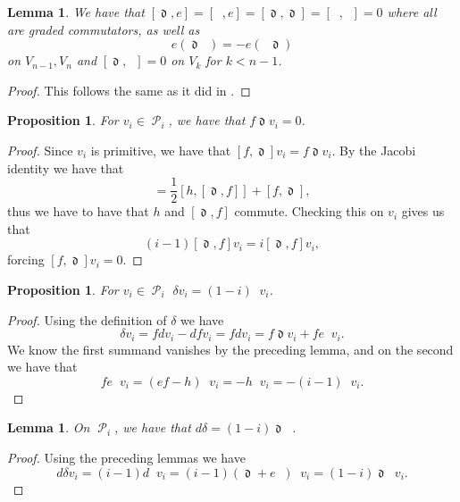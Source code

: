 \documentclass{amsart}
\newtheorem{lemma}[theorem]{Lemma}
\newtheorem{prop}[theorem]{Proposition}
\DeclareMathOperator{\dee}{\mathfrak{d}}
\DeclareMathOperator{\deebar}{\overline{\mathfrak{d}}}
\DeclareMathOperator{\Prim}{\mathcal{P}}
\theoremstyle{definition}
\begin{document}
\begin{lemma}
    We have that $[\dee,e]=[\deebar,e]=[\dee,\dee]=[\deebar,\deebar]=0$ where all are graded commutators, as well as
    \begin{equation*}
        e(\dee \deebar) = - e (\deebar \dee)
    \end{equation*}
      on $V_{n-1},V_n$ and $[\dee,\deebar]=0$ on $V_k$ for $k < n-1$.
\end{lemma}
\begin{proof}
    This follows the same as it did in \cite[Lemma 2.5]{tseng2012cohomologyhodgetheorysymplectic}.
\end{proof}
\begin{prop}
    For $v_i \in \Prim_i$, we have that $f \dee v_i=0$.
\end{prop}
\begin{proof}
    Since $v_i$ is primitive, we have that $[f,\dee]v_i = f \dee v_i$. By the Jacobi identity we have that 
    \begin{equation*}
        [f,\dee] = \frac{1}{2}[h,[\dee ,f]] + [f, \dee],
    \end{equation*}
    thus we have to have that $h$ and $[\dee,f]$ commute. Checking this on $v_i$ gives us that
    \begin{equation*}
        (i-1)[\dee,f]v_i = i[\dee,f]v_i,
    \end{equation*}
    forcing $[f,\dee]v_i=0$.
\end{proof}
\begin{prop}
 For $v_i \in \Prim_i$ $\delta v_i = (1-i)\deebar v_i$.
\end{prop}
\begin{proof}
    Using the definition of $\delta$ we have
    \begin{equation*}
        \delta v_i = fdv_i - dfv_i = fdv_i = f\dee v_i + fe\deebar v_i.
    \end{equation*}
    We know the first summand vanishes by the preceding lemma, and on the second we have that
    \begin{equation*}
        fe\deebar v_i = (ef - h)\deebar v_i = -h\deebar v_i = -(i-1) \deebar v_i.
    \end{equation*}
\end{proof}
\begin{lemma}
    On $\Prim_i$, we have that $d \delta = (1-i) \dee \deebar$.
\end{lemma}
\begin{proof}
    Using the preceding lemmas we have
    \begin{equation*}
        d \delta v_i = (i-1)d \deebar v_i = (i-1)(\dee + e \deebar)\deebar v_i = (1-i)\dee \deebar v_i.
    \end{equation*}
\end{proof}
\end{document}
